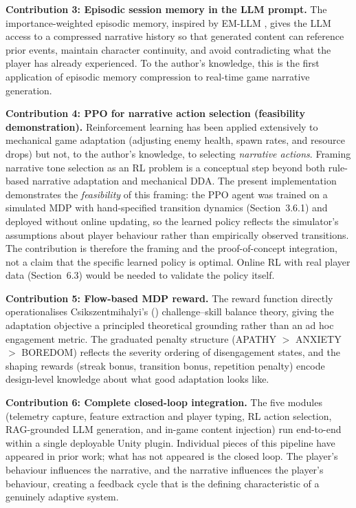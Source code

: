 \textbf{Contribution 3: Episodic session memory in the LLM prompt.} The importance-weighted episodic memory, inspired by EM-LLM \citep{fountas2024episodic}, gives the LLM access to a compressed narrative history so that generated content can reference prior events, maintain character continuity, and avoid contradicting what the player has already experienced. To the author's knowledge, this is the first application of episodic memory compression to real-time game narrative generation.

\textbf{Contribution 4: PPO for narrative action selection (feasibility demonstration).} Reinforcement learning has been applied extensively to mechanical game adaptation (adjusting enemy health, spawn rates, and resource drops) but not, to the author's knowledge, to selecting \textit{narrative actions}. Framing narrative tone selection as an RL problem is a conceptual step beyond both rule-based narrative adaptation and mechanical DDA. The present implementation demonstrates the \textit{feasibility} of this framing: the PPO agent was trained on a simulated MDP with hand-specified transition dynamics (Section~3.6.1) and deployed without online updating, so the learned policy reflects the simulator's assumptions about player behaviour rather than empirically observed transitions. The contribution is therefore the framing and the proof-of-concept integration, not a claim that the specific learned policy is optimal. Online RL with real player data (Section~6.3) would be needed to validate the policy itself.

\textbf{Contribution 5: Flow-based MDP reward.} The reward function directly operationalises Csikszentmihalyi's (\citeyear{csikszentmihalyi1990flow}) challenge--skill balance theory, giving the adaptation objective a principled theoretical grounding rather than an ad hoc engagement metric. The graduated penalty structure (APATHY $>$ ANXIETY $>$ BOREDOM) reflects the severity ordering of disengagement states, and the shaping rewards (streak bonus, transition bonus, repetition penalty) encode design-level knowledge about what good adaptation looks like.

\textbf{Contribution 6: Complete closed-loop integration.} The five modules (telemetry capture, feature extraction and player typing, RL action selection, RAG-grounded LLM generation, and in-game content injection) run end-to-end within a single deployable Unity plugin. Individual pieces of this pipeline have appeared in prior work; what has not appeared is the closed loop. The player's behaviour influences the narrative, and the narrative influences the player's behaviour, creating a feedback cycle that is the defining characteristic of a genuinely adaptive system.

